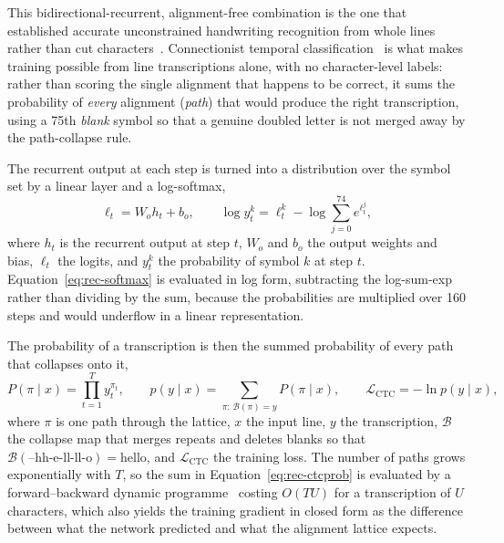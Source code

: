 This bidirectional-recurrent, alignment-free combination is the one that established accurate unconstrained handwriting recognition from whole lines rather than cut characters~\cite[p.~855]{graves2009}. Connectionist temporal classification~\cite[p.~370]{graves2006} is what makes training possible from line transcriptions alone, with no character-level labels: rather than scoring the single alignment that happens to be correct, it sums the probability of \emph{every} alignment (\emph{path}) that would produce the right transcription, using a 75th \emph{blank} symbol so that a genuine doubled letter is not merged away by the path-collapse rule.

The recurrent output at each step is turned into a distribution over the symbol set by a linear layer and a log-softmax,
\begin{equation}
\ell_t=W_oh_t+b_o,\qquad \log y_t^k=\ell_t^k-\log\sum_{j=0}^{74}e^{\ell_t^j},
\label{eq:rec-softmax}
\end{equation}
where $h_t$ is the recurrent output at step $t$, $W_o$ and $b_o$ the output weights and bias, $\ell_t$ the logits, and $y_t^k$ the probability of symbol $k$ at step $t$. Equation~\ref{eq:rec-softmax} is evaluated in log form, subtracting the log-sum-exp rather than dividing by the sum, because the probabilities are multiplied over 160 steps and would underflow in a linear representation.

The probability of a transcription is then the summed probability of every path that collapses onto it,
\begin{equation}
P(\pi\mid x)=\prod_{t=1}^{T}y_t^{\pi_t},\qquad p(y\mid x)=\!\!\sum_{\pi:\,\mathcal B(\pi)=y}\!\!P(\pi\mid x),\qquad \mathcal L_{\mathrm{CTC}}=-\ln p(y\mid x),
\label{eq:rec-ctcprob}
\end{equation}
where $\pi$ is one path through the lattice, $x$ the input line, $y$ the transcription, $\mathcal B$ the collapse map that merges repeats and deletes blanks so that $\mathcal B(\text{--hh-e-ll-ll-o})=\text{hello}$, and $\mathcal L_{\mathrm{CTC}}$ the training loss. The number of paths grows exponentially with $T$, so the sum in Equation~\ref{eq:rec-ctcprob} is evaluated by a forward--backward dynamic programme~\cite[p.~372]{graves2006} costing $O(TU)$ for a transcription of $U$ characters, which also yields the training gradient in closed form as the difference between what the network predicted and what the alignment lattice expects.

